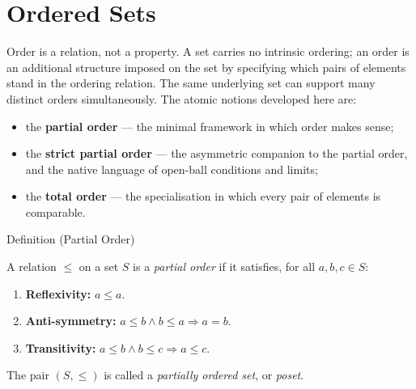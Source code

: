 
\section{Ordered Sets}
\label{sec:ordered-sets}

\begin{remark*}
Order is a relation, not a property.  A set carries no intrinsic ordering;
an order is an additional structure imposed on the set by specifying which
pairs of elements stand in the ordering relation.  The same underlying set
can support many distinct orders simultaneously.  The atomic notions
developed here are:
\begin{itemize}
  \item the \textbf{partial order} --- the minimal framework in which order
        makes sense;
  \item the \textbf{strict partial order} --- the asymmetric companion to the
        partial order, and the native language of open-ball conditions and
        limits;
  \item the \textbf{total order} --- the specialisation in which every pair of
        elements is comparable.
\end{itemize}
\end{remark*}


\begin{definitionbox}{Definition (Partial Order)}
\begin{definition}
\label{def:lattice-order-partial-order}
A relation $\leq$ on a set $S$ is a \emph{partial order} if it satisfies,
for all $a, b, c \in S$:
\begin{enumerate}
  \item \textbf{Reflexivity:} $a \leq a$.
  \item \textbf{Anti-symmetry:} $a \leq b \land b \leq a \Longrightarrow a = b$.
  \item \textbf{Transitivity:} $a \leq b \land b \leq c \Longrightarrow a \leq c$.
\end{enumerate}
The pair $(S, \leq)$ is called a \emph{partially ordered set}, or \emph{poset}.
\end{definition}
\end{definitionbox}


